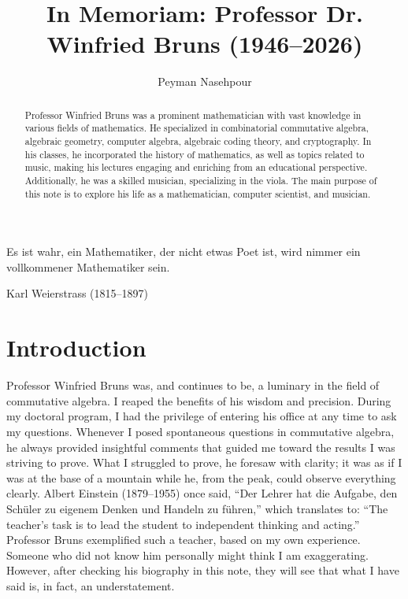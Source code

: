 \documentclass[10pt]{amsart}
\title{In Memoriam: Professor Dr. Winfried Bruns (1946--2026)}
\author{Peyman Nasehpour}
\begin{document}
	\begin{abstract}
	Professor Winfried Bruns was a prominent mathematician with vast knowledge in various fields of mathematics. He specialized in combinatorial commutative algebra, algebraic geometry, computer algebra, algebraic coding theory, and cryptography. In his classes, he incorporated the history of mathematics, as well as topics related to music, making his lectures engaging and enriching from an educational perspective. Additionally, he was a skilled musician, specializing in the viola. The main purpose of this note is to explore his life as a mathematician, computer scientist, and musician.
\end{abstract}
	
	\maketitle
	

	
	\vspace{1em}
	
	\epigraph{
		Es ist wahr, ein Mathematiker, der nicht etwas Poet ist, wird nimmer ein vollkommener Mathematiker sein.
	}{
		Karl Weierstrass (1815--1897)
	}
	
	\vspace{1.5em}
	
	\section*{Introduction}
	
	Professor Winfried Bruns was, and continues to be, a luminary in the field of commutative algebra. I reaped the benefits of his wisdom and precision. During my doctoral program, I had the privilege of entering his office at any time to ask my questions. Whenever I posed spontaneous questions in commutative algebra, he always provided insightful comments that guided me toward the results I was striving to prove. What I struggled to prove, he foresaw with clarity; it was as if I was at the base of a mountain while he, from the peak, could observe everything clearly. Albert Einstein (1879--1955) once said, ``Der Lehrer hat die Aufgabe, den Sch\"{u}ler zu eigenem Denken und Handeln zu f\"{u}hren,'' which translates to: ``The teacher's task is to lead the student to independent thinking and acting.'' Professor Bruns exemplified such a teacher, based on my own experience. Someone who did not know him personally might think I am exaggerating. However, after checking his biography in this note, they will see that what I have said is, in fact, an understatement.
	
\end{document}
